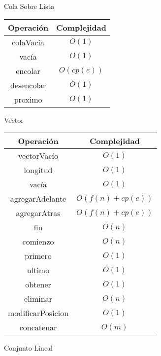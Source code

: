 \documentclass{article}
\begin{document}
\begin{multicols}{2}
\begin{center}
	\begin{large}Cola Sobre Lista\end{large}
	\vspace*{2mm}
	
	\begin{tabular}{|c|c|}
		\hline
		\textbf{Operación} & \textbf{Complejidad} \\
		\hline
		colaVacía & $O(1)$ \\
		vacía & $O(1)$ \\
		encolar & $O(cp(e))$ \\
		desencolar & $O(1)$ \\
		proximo & $O(1)$ \\
		\hline
	\end{tabular}
\end{center}


\begin{center}
	\begin{large}Vector\end{large}
	\vspace*{2mm}
	
	\begin{tabular}{|c|c|}
		\hline
		\textbf{Operación} & \textbf{Complejidad} \\
		\hline
		vectorVacío & $O(1)$ \\
		longitud & $O(1)$ \\
		vacía & $O(1)$ \\
		agregarAdelante & $O(f(n) + cp(e))$ \\
		agregarAtras & $O(f(n) + cp(e))$ \\
		fin & $O(n)$ \\
		comienzo & $O(n)$ \\
		primero & $O(1)$ \\
		ultimo & $O(1)$ \\
		\hline
		obtener & $O(1)$ \\
		eliminar & $O(n)$ \\
		modificarPosicion & $O(1)$ \\
		concatenar & $O(m)$ \\
		\hline
	\end{tabular}
\end{center}


\begin{center}
	\begin{large}Conjunto Lineal\end{large}
	\vspace*{2mm}
	

\end{center}
\end{multicols}
\end{document}

